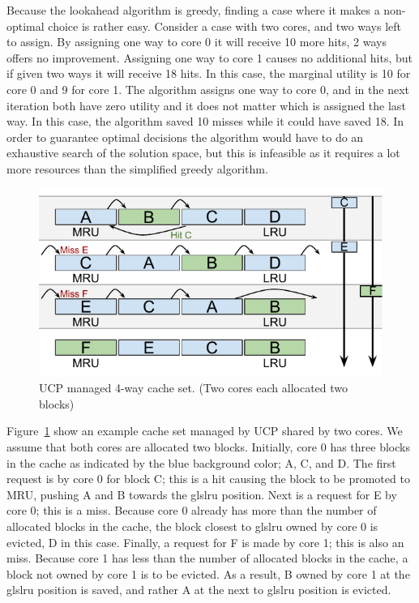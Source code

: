 Because the lookahead algorithm is greedy, finding a case where it makes a non-optimal choice is rather easy.
Consider a case with two cores, and two ways left to assign.
By assigning one way to core 0 it will receive 10 more hits, 2 ways offers no improvement.
Assigning one way to core 1 causes no additional hits, but if given two ways it will receive 18 hits.
In this case, the marginal utility is 10 for core 0 and 9 for core 1.
The algorithm assigns one way to core 0, and in the next iteration both have zero utility and it does not matter which is assigned the last way.
In this case, the algorithm saved 10 misses while it could have saved 18.
In order to guarantee optimal decisions the algorithm would have to do an exhaustive search of the solution space, but this is infeasible as it requires a lot more resources than the simplified greedy algorithm.

\begin{figure}[ht]
    \centering
    \includegraphics[width=.65\textwidth]{figures/algorithms/UCP}
    \caption[UCP managed 4-way cache set.]{UCP managed 4-way cache set. (Two cores each allocated two blocks)}
    \label{fig:algorithms:ucp_example}
\end{figure}

Figure~\ref{fig:algorithms:ucp_example} show an example cache set managed by UCP shared by two cores.
We assume that both cores are allocated two blocks.
Initially, core 0 has three blocks in the cache as indicated by the blue background color; A, C, and D.
The first request is by core 0 for block C; this is a hit causing the block to be promoted to MRU, pushing A and B towards the gls{lru} position.
Next is a request for E by core 0; this is a miss.
Because core 0 already has more than the number of allocated blocks in the cache, the block closest to gls{lru} owned by core 0 is evicted, D in this case.
Finally, a request for F is made by core 1; this is also an miss.
Because core 1 has less than the number of allocated blocks in the cache, a block not owned by core 1 is to be evicted.
As a result, B owned by core 1 at the gls{lru} position is saved, and rather A at the next to gls{lru} position is evicted.




